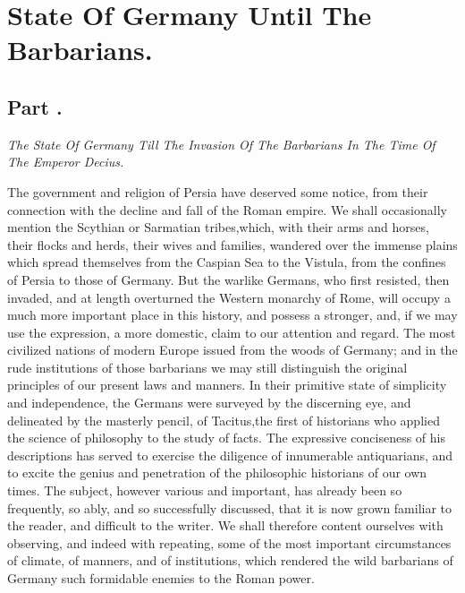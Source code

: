 \chapter{State Of Germany Until The Barbarians.}
\section{Part \thesection.}

\textit{The State Of Germany Till The Invasion Of The Barbarians In The
Time Of The Emperor Decius.}
\vspace{\onelineskip}

The government and religion of Persia have deserved some notice,
from their connection with the decline and fall of the Roman
empire. We shall occasionally mention the Scythian or Sarmatian
tribes,\footnotemark[1001] which, with their arms and horses, their flocks and
herds, their wives and families, wandered over the immense plains
which spread themselves from the Caspian Sea to the Vistula, from
the confines of Persia to those of Germany. But the warlike
Germans, who first resisted, then invaded, and at length
overturned the Western monarchy of Rome, will occupy a much more
important place in this history, and possess a stronger, and, if
we may use the expression, a more domestic, claim to our
attention and regard. The most civilized nations of modern Europe
issued from the woods of Germany; and in the rude institutions of
those barbarians we may still distinguish the original principles
of our present laws and manners. In their primitive state of
simplicity and independence, the Germans were surveyed by the
discerning eye, and delineated by the masterly pencil, of
Tacitus,\footnotemark[1002] the first of historians who applied the science of
philosophy to the study of facts. The expressive conciseness of
his descriptions has served to exercise the diligence of
innumerable antiquarians, and to excite the genius and
penetration of the philosophic historians of our own times. The
subject, however various and important, has already been so
frequently, so ably, and so successfully discussed, that it is
now grown familiar to the reader, and difficult to the writer. We
shall therefore content ourselves with observing, and indeed with
repeating, some of the most important circumstances of climate,
of manners, and of institutions, which rendered the wild
barbarians of Germany such formidable enemies to the Roman power.

